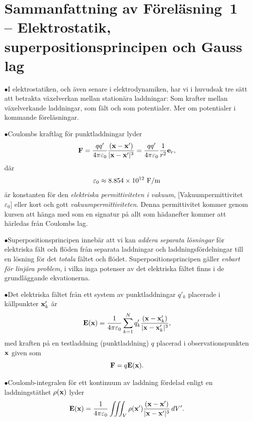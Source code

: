 {\section{Sammanfattning av F{\"o}rel{\"a}sning~1 -- Elektrostatik,
  superpositionsprincipen och Gauss lag}
\item{$\bullet$}{I elektrostatiken, och {\"a}ven senare i elektrodynamiken,
  har vi i huvudsak tre s{\"a}tt att betrakta v{\"a}xelverkan mellan
  station{\"a}ra laddningar: Som krafter mellan v{\"a}xelverkande laddningar,
  som f{\"a}lt och som potentialer. Mer om potentialer i kommande
  f{\"o}rel{\"a}sningar.}
\item{$\bullet$}{Coulombs kraftlag f{\"o}r punktladdningar lyder
  $$
    {\bf F}
      ={{qq'}\over{4\pi\varepsilon_0}}
        {{({\bf x}-{\bf x}')}\over{|{\bf x}-{\bf x}'|^3}}
      ={{qq'}\over{4\pi\varepsilon_0}}{{1}\over{r^2}}{\bf e}_r,
  $$
  d{\"a}r
  $$
    \varepsilon_0\approx8.854\times10^{12}\ {\rm F}/{\rm m}
  $$
  {\"a}r konstanten f{\"o}r den {\it elektriska permittiviteten i
  vakuum}, [Vakuumpermittivitet $\varepsilon_0$]
  eller kort och gott {\it vakuumpermittiviteten}. Denna permittivitet
  kommer genom kursen att h{\"a}nga med som en signatur p{\aa} allt som
  h{\"a}danefter kommer att h{\"a}rledas fr{\aa}n Coulombs lag.}
\item{$\bullet$}{Superpositionsprincipen inneb{\"a}r att vi kan
  {\it addera separata l{\"o}sningar} f{\"o}r elektriska f{\"a}lt
  och fl{\"o}den fr{\aa}n separata laddningar och laddningsf{\"o}rdelningar
  till en l{\"o}sning f{\"o}r det {\it totala} f{\"a}ltet och fl{\"o}det.
  Superpositionsprincipen g{\"a}ller {\it enbart f{\"o}r linj{\"a}ra
  problem}, i vilka inga potenser av det elektriska f{\"a}ltet finns
  i de grund\-l{\"a}ggande ekvationerna.}
\item{$\bullet$}{Det elektriska f{\"a}ltet fr{\aa}n ett system av
  punktladdningar $q'_k$ placerade i k{\"a}llpunkter ${\bf x}'_k$ {\"a}r
  $$
    {\bf E}({\bf x})={{1}\over{4\pi\varepsilon_0}}\sum^N_{k=1}
       q'_k {{({\bf x}-{\bf x}'_k)}\over{|{\bf x}-{\bf x}'_k|^3}},
  $$
  med kraften p{\aa} en testladdning (punktladdning) $q$ placerad i
  observationspunkten ${\bf x}$ given som
  $$
    {\bf F}=q{\bf E}({\bf x}).
  $$}
\item{$\bullet$}{Coulomb-integralen f{\"o}r ett kontinuum av laddning
  f{\"o}rdelad enligt en laddningst{\"a}thet $\rho({\bf x})$ lyder
  $$
    {\bf E}({\bf x})={{1}\over{4\pi\varepsilon_0}}\iiint_V\rho({\bf x}')
      {{({\bf x}-{\bf x}')}\over{|{\bf x}-{\bf x}'|^3}}\,dV'.
$$}}
